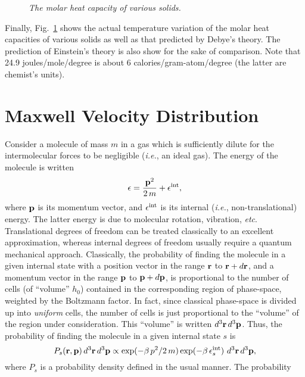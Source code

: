 \begin{figure}[ht]
\epsfysize=3.5in
\centerline{}
\caption{\em The molar heat capacity of various solids.}\label{f2}
\end{figure}

Finally, Fig.~\ref{f2} shows  the actual temperature variation of the molar heat capacities
of various solids as well as  that predicted by  Debye's theory. The prediction of Einstein's theory
is also show for the sake of comparison. Note that 24.9 joules/mole/degree is about
6 calories/gram-atom/degree (the latter  are chemist's units).

\section{Maxwell Velocity Distribution}
Consider a molecule of mass $m$ in a gas which is sufficiently 
dilute for the intermolecular forces to be negligible ({\em i.e.},
 an ideal gas). 
The energy of the molecule is written
\begin{equation}
\epsilon = \frac{{\bf p}^2}{2\,m} + \epsilon^{\rm int},
\end{equation}
where $\bf p$ is its momentum vector, and $\epsilon^{\rm int}$ is its
internal ({\em i.e.}, non-translational)
 energy.  The latter energy  is due to molecular rotation, vibration, {\em etc}.
Translational degrees of freedom can be treated classically to an excellent
approximation, whereas  internal degrees of freedom usually require a quantum
mechanical approach. 
Classically, the probability of finding the molecule in  a given internal
state with a position vector in the range $\bf r$ to ${\bf r} + d{\bf r}$,
and a momentum vector in the range $\bf p$ to ${\bf p} + d{\bf p}$, is proportional
to the number of cells (of ``volume'' $h_0$) contained in the corresponding region
of phase-space, weighted   by the Boltzmann factor. 
In fact, since classical phase-space is divided up into {\em uniform}\/ cells,
the number of cells is just proportional to the ``volume'' of
the region under consideration. This ``volume'' is written $d^3{\bf r}\,d^3{\bf p}$.
 Thus, the probability of finding the molecule in a given internal state $s$ 
is
\begin{equation}
P_s({\bf r}, {\bf p}) \,d^3{\bf r}\,d^3{\bf p} \propto 
\exp(-\beta\,p^2/2\,m ) \exp(-\beta\,\epsilon^{\rm int}_s)\,\,d^3{\bf r}\,d^3{\bf p},
\end{equation}
where $P_s$ is a probability density defined in the usual manner. The probability
